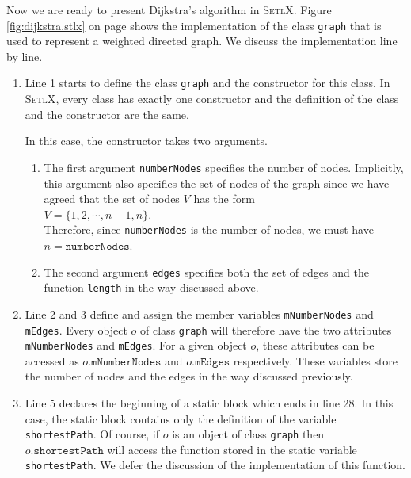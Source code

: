 \noindent
Now we are ready to present Dijkstra's algorithm in \textsc{SetlX}.
Figure \ref{fig:dijkstra.stlx} on page \pageref{fig:dijkstra.stlx} shows the implementation of the
class \texttt{graph} that is used to represent a weighted directed graph.  We discuss the
implementation line by line.
\begin{enumerate}
\item Line 1 starts to define the class \texttt{graph} and the constructor for
      this class.  In \textsc{SetlX}, every class has exactly one constructor and the definition of
      the class and the constructor are the same.  

      In this case, the constructor takes two arguments.  
      \begin{enumerate}
      \item The first argument \texttt{numberNodes}
            specifies the number of nodes.  Implicitly, this argument also specifies the set of nodes
            of the graph since we have agreed that the set of nodes $V$ has the form
            \\[0.2cm]
            \hspace*{1.3cm}
            $V = \{1,2,\cdots, n-1, n\}$.
            \\[0.2cm]
            Therefore, since \texttt{numberNodes} is the number of nodes, we must have 
            $n = \mathtt{numberNodes}$.
      \item The second argument \texttt{edges} specifies both the set of edges and the function
            \texttt{length}  in the way discussed above.
      \end{enumerate}
\item Line 2 and 3 define and assign the member variables \texttt{mNumberNodes} and \texttt{mEdges}.
      Every object $o$ of class \texttt{graph} will therefore have the two attributes
      \texttt{mNumberNodes} and \texttt{mEdges}.  For a given object $o$, these attributes can be
      accessed as $o\mathtt{.mNumberNodes}$ and $o\mathtt{.mEdges}$ respectively.  
      These variables store the number of nodes and the edges in the way discussed previously.
\item Line 5 declares the beginning of a static block which ends in line 28.  
      In this case, the static block contains only the definition of the variable \texttt{shortestPath}.
      Of course, if $o$ is an object of class
      \texttt{graph} then $o\mathtt{.shortestPath}$ will access the function stored in the
      static variable \texttt{shortestPath}.  We defer the discussion of the implementation of this
      function.
\end{enumerate}
